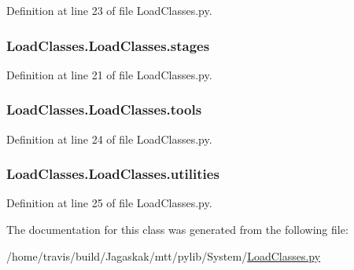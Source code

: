 Definition at line 23 of file Load\-Classes.\-py.

\hypertarget{classLoadClasses_1_1LoadClasses_aca4663cc6002ec1139e8b07f15aa1006}{
\subsubsection[{stages}]{\setlength{\rightskip}{0pt plus 5cm}Load\-Classes.\-Load\-Classes.\-stages}}\label{classLoadClasses_1_1LoadClasses_aca4663cc6002ec1139e8b07f15aa1006}


Definition at line 21 of file Load\-Classes.\-py.

\hypertarget{classLoadClasses_1_1LoadClasses_acea1357ee5b059c0c010c62d9dcdfd42}{
\subsubsection[{tools}]{\setlength{\rightskip}{0pt plus 5cm}Load\-Classes.\-Load\-Classes.\-tools}}\label{classLoadClasses_1_1LoadClasses_acea1357ee5b059c0c010c62d9dcdfd42}


Definition at line 24 of file Load\-Classes.\-py.

\hypertarget{classLoadClasses_1_1LoadClasses_a9bc5a2e86aee8dffd444ea68bc9258de}{
\subsubsection[{utilities}]{\setlength{\rightskip}{0pt plus 5cm}Load\-Classes.\-Load\-Classes.\-utilities}}\label{classLoadClasses_1_1LoadClasses_a9bc5a2e86aee8dffd444ea68bc9258de}


Definition at line 25 of file Load\-Classes.\-py.



The documentation for this class was generated from the following file\-:\begin{DoxyCompactItemize}
\item 
/home/travis/build/\-Jagaskak/mtt/pylib/\-System/\hyperlink{LoadClasses_8py}{Load\-Classes.\-py}\end{DoxyCompactItemize}
